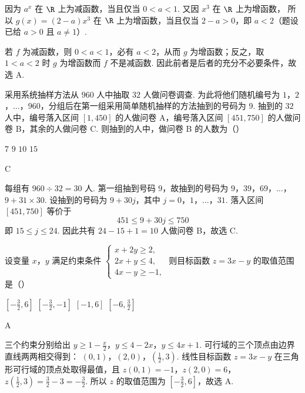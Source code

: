 \begin{solution}
因为 \(a^x\) 在 \(\R\) 上为减函数，当且仅当 \(0<a<1\). 又因 \(x^3\) 在 \(\R\) 上为增函数，
所以 \(g(x)=(2-a)x^3\) 在 \(\R\) 上为增函数，当且仅当 \(2-a>0\)，即 \(a<2\)（题设已给 \(a>0\) 且 \(a\ne1\)）.

若 \(f\) 为减函数，则 \(0<a<1\)，必有 \(a<2\)，从而 \(g\) 为增函数；反之，取 \(1<a<2\) 时 \(g\) 为增函数而 \(f\) 不是减函数. 因此前者是后者的充分不必要条件，故选 A.
\end{solution}

\begin{problem}
采用系统抽样方法从 \(960\) 人中抽取 \(32\) 人做问卷调查. 为此将他们随机编号为 \(1\)，\(2\)，\(\ldots\)，\(960\)，分组后在第一组采用简单随机抽样的方法抽到的号码为 \(9\). 抽到的 \(32\) 人中，编号落入区间 \([1, 450]\) 的人做问卷 A，编号落入区间 \([451, 750]\) 的人做问卷 B，其余的人做问卷 C. 则抽到的人中，做问卷 B 的人数为（\quad）

\choices
    {\(7\)}
    {\(9\)}
    {\(10\)}
    {\(15\)}
\end{problem}

\begin{answer}
C
\end{answer}

\begin{solution}
每组有 \(960\div32=30\) 人. 第一组抽到号码 \(9\)，故抽到的号码为
\(9\)，\(39\)，\(69\)，\(\ldots\)，\(9+31\times30\).
设抽到的号码为 \(9+30j\)，其中 \(j=0\)，\(1\)，\(\ldots\)，\(31\). 落入区间 \([451,750]\) 等价于
\[
451\leqslant9+30j\leqslant750
\]
即 \(15\leqslant j\leqslant24\). 因此共有 \(24-15+1=10\) 人做问卷 B，故选 C.
\end{solution}

\begin{problem}
设变量 \(x\)，\(y\) 满足约束条件 \(\begin{cases}
x + 2y \geqslant 2,\\
2x + y \leqslant 4,\\
4x - y \geqslant -1,
\end{cases}\) 则目标函数 \(z = 3x - y\) 的取值范围是（\quad）

\choices
    {\(\left[-\frac{3}{2}, 6\right]\)}
    {\(\left[-\frac{3}{2}, -1\right]\)}
    {\([-1,6]\)}
    {\(\left[-6, \frac{3}{2}\right]\)}
\end{problem}

\begin{answer}
A
\end{answer}

\begin{solution}
三个约束分别给出
\(y\geqslant1-\frac{x}{2}\)，\(y\leqslant4-2x\)，\(y\leqslant4x+1\).
可行域的三个顶点由边界直线两两相交得到：
\((0,1)\)，\((2,0)\)，\(\left(\frac12,3\right)\).
线性目标函数 \(z=3x-y\) 在三角形可行域的顶点处取得最值，且
\(z(0,1)=-1\)，\(z(2,0)=6\)，\(z\left(\frac12,3\right)=\frac32-3=-\frac32\).
所以 \(z\) 的取值范围为 \(\left[-\frac32,6\right]\)，故选 A.
\end{solution}

